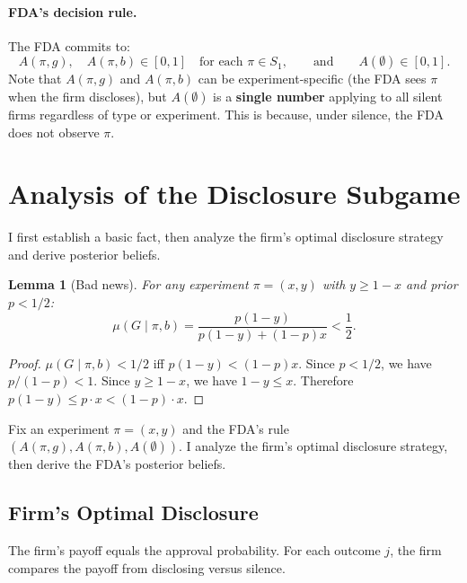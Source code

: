 \documentclass[12pt,a4paper]{article}
\newtheorem{lemma}{Lemma}
\begin{document}
\paragraph{FDA's decision rule.}
The FDA commits to:
\begin{equation}\label{eq:fda_rule}
  A(\pi, g), \quad A(\pi, b) \in [0, 1]
  \quad \text{for each } \pi \in S_1,
  \qquad\text{and}\qquad
  A(\emptyset) \in [0, 1].
\end{equation}
Note that $A(\pi, g)$ and $A(\pi, b)$ can be
experiment-specific (the FDA sees $\pi$ when the firm
discloses), but $A(\emptyset)$ is a \textbf{single number}
applying to all silent firms regardless of type or experiment.
This is because, under silence, the FDA does not observe $\pi$.


\section{Analysis of the Disclosure Subgame}
\label{sec:disclosure}

I first establish a basic fact, then analyze the firm's
optimal disclosure strategy and derive posterior beliefs.

\begin{lemma}[Bad news]\label{lem:bad_news}
For any experiment $\pi = (x,y)$ with $y \geq 1 - x$ and
prior $p < 1/2$:
\[
  \mu(G \mid \pi, b)
  = \frac{p(1-y)}{p(1-y) + (1-p)x}
  < \frac{1}{2}.
\]
\end{lemma}

\begin{proof}
$\mu(G \mid \pi, b) < 1/2$ iff $p(1-y) < (1-p)x$.
Since $p < 1/2$, we have $p/(1-p) < 1$.
Since $y \geq 1-x$, we have $1-y \leq x$.
Therefore $p(1-y) \leq p \cdot x < (1-p) \cdot x$.
\end{proof}

Fix an experiment $\pi = (x, y)$ and the FDA's rule
$(A(\pi, g), A(\pi, b), A(\emptyset))$. I analyze the
firm's optimal disclosure strategy, then derive the FDA's
posterior beliefs.

\subsection{Firm's Optimal Disclosure}

The firm's payoff equals the approval probability. For each
outcome $j$, the firm compares the payoff from disclosing
versus silence.
\end{document}
